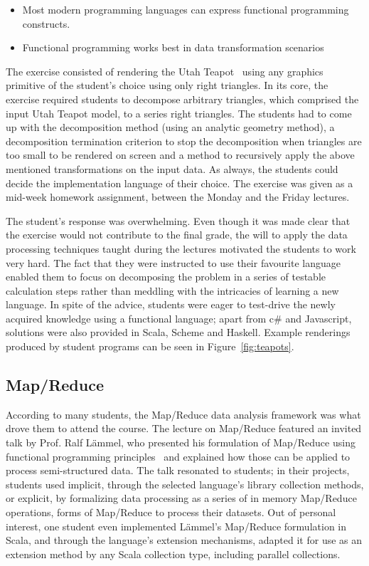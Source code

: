 \documentclass[conference]{IEEEtran}
\begin{document}
\begin{itemize}

  \item Most modern programming languages can express functional programming
    constructs.

  \item Functional programming works best in data transformation scenarios

\end{itemize}

The exercise consisted of rendering the Utah Teapot~\cite{Torre06} using any
graphics primitive of the student's choice using only right triangles.  In its
core, the exercise required students to decompose arbitrary triangles, which
comprised the input Utah Teapot model, to a series right triangles. The students
had to come up with the decomposition method (using an analytic geometry
method), a decomposition termination criterion to stop the decomposition when
triangles are too small to be rendered on screen and a method to recursively
apply the above mentioned transformations on the input data. As always, the
students could decide the implementation language of their choice. The exercise
was given as a mid-week homework assignment, between the Monday and the Friday
lectures.

The student's response was overwhelming. Even though it was made clear that the
exercise would not contribute to the final grade, the will to apply the data
processing techniques taught during the lectures motivated the students to work
very hard. The fact that they were instructed to use their favourite language
enabled them to focus on decomposing the problem in a series of testable
calculation steps rather than meddling with the intricacies of learning a new 
language. In spite of the advice, students were eager to test-drive the newly
acquired knowledge using a functional language; apart from {\sc c\#} and
Javascript, solutions were also provided in Scala, Scheme and Haskell. Example
renderings produced by student programs can be seen in Figure~\ref{fig:teapots}.

\subsection{Map/Reduce}

According to many students, the Map/Reduce data analysis framework was what
drove them to attend the course. The lecture on Map/Reduce featured an invited
talk by Prof. Ralf L\"ammel, who presented his formulation of Map/Reduce using
functional programming principles~\cite{Lamme08} and explained how those can be
applied to process semi-structured data. The talk resonated to students; in
their projects, students used implicit, through the selected language's library
collection methods, or explicit, by formalizing data processing as a series of
in memory Map/Reduce operations, forms of Map/Reduce to process their datasets.
Out of personal interest, one student even implemented L\"ammel's Map/Reduce
formulation in Scala, and through the language's extension mechanisms, adapted
it for use as an extension method by any Scala collection type, including
parallel collections. 
\end{document}
